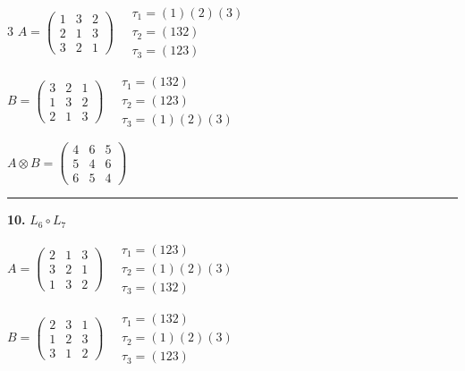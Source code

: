 \begin{multicols}{3}
$A = \begin{pmatrix} 1 & 3 & 2 \\ 2 & 1 & 3 \\ 3 & 2 & 1 \end{pmatrix} \quad \begin{matrix} \tau_{1}=(1)(2)(3) \\ \tau_{2}=(1 3 2) \\ \tau_{3}=(1 2 3) \end{matrix}$

$B = \begin{pmatrix} 3 & 2 & 1 \\ 1 & 3 & 2 \\ 2 & 1 & 3 \end{pmatrix} \quad \begin{matrix} \tau_{1}=(1 3 2) \\ \tau_{2}=(1 2 3) \\ \tau_{3}=(1)(2)(3) \end{matrix}$

$A \otimes B = \begin{pmatrix} 4 & 6 & 5 \\ 5 & 4 & 6 \\ 6 & 5 & 4 \end{pmatrix}$

\vspace{0.3em}
\hrule
\vspace{0.3em}

\noindent\textbf{10.} $L_{6} \circ L_{7}$

$A = \begin{pmatrix} 2 & 1 & 3 \\ 3 & 2 & 1 \\ 1 & 3 & 2 \end{pmatrix} \quad \begin{matrix} \tau_{1}=(1 2 3) \\ \tau_{2}=(1)(2)(3) \\ \tau_{3}=(1 3 2) \end{matrix}$

$B = \begin{pmatrix} 2 & 3 & 1 \\ 1 & 2 & 3 \\ 3 & 1 & 2 \end{pmatrix} \quad \begin{matrix} \tau_{1}=(1 3 2) \\ \tau_{2}=(1)(2)(3) \\ \tau_{3}=(1 2 3) \end{matrix}$


\end{multicols}
